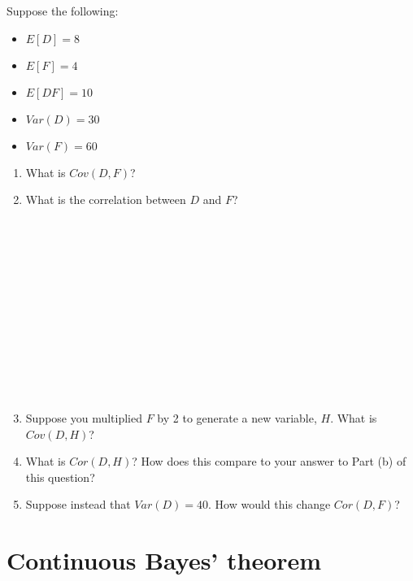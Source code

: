 \documentclass[
]{article}
\providecommand{\tightlist}{%
  \setlength{\itemsep}{0pt}\setlength{\parskip}{0pt}}
\begin{document}
Suppose the following:

\begin{itemize}
\tightlist
\item
  \(E[D] = 8\)
\item
  \(E[F] = 4\)
\item
  \(E[DF] = 10\)
\item
  \(Var(D) = 30\)
\item
  \(Var(F) = 60\)
\end{itemize}

\begin{enumerate}
\def\labelenumi{\alph{enumi}.}
\item
  What is \(Cov(D,F)\)?

  \hfill\break
  \hfill\break
  \hfill\break
  \hfill\break
  \hfill\break
  \hfill\break
  \hfill\break
\item
  What is the correlation between \(D\) and \(F\)?

  \strut \\
  \strut \\
  \strut \\
  \strut \\
  \strut \\
  \strut \\
  \strut \\
\item
  Suppose you multiplied \(F\) by 2 to generate a new variable, \(H\).
  What is \(Cov(D,H)\)?

  \hfill\break
  \hfill\break
  \hfill\break
  \hfill\break
  \hfill\break
  \hfill\break
  \hfill\break
  \hfill\break
  \hfill\break
  \hfill\break
\item
  What is \(Cor(D,H)\)? How does this compare to your answer to Part (b)
  of this question?

  \hfill\break
  \hfill\break
  \hfill\break
  \hfill\break
  \hfill\break
  \hfill\break
  \hfill\break
  \hfill\break
  \hfill\break
  \hfill\break
\item
  Suppose instead that \(Var(D) = 40\). How would this change
  \(Cor(D,F)\)?

  \hfill\break
  \hfill\break
  \hfill\break
  \hfill\break
  \hfill\break
  \hfill\break
  \hfill\break
  \hfill\break
  \hfill\break
  \hfill\break
\end{enumerate}

\section{Continuous Bayes' theorem}\label{continuous-bayes-theorem}
\end{document}
